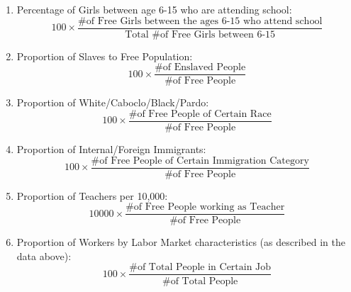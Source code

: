 \documentclass{article}
\begin{document}
\begin{enumerate}
  \item Percentage of Girls between age 6-15 who are attending school:
  \begin{equation*}
    100 \times \frac{\text{\# of Free Girls between the ages 6-15 who attend school}}{\text{Total \# of Free Girls between 6-15}}
  \end{equation*}

  \item Proportion of Slaves to Free Population:
  $$ 100 \times \frac{\text{\# of Enslaved People}}{\text{\# of Free People}} $$

  \item Proportion of White/Caboclo/Black/Pardo:
  $$ 100 \times \frac{\text{\# of Free People of Certain Race}}{\text{\# of Free People}}$$

  \item Proportion of Internal/Foreign Immigrants:
  $$ 100 \times \frac{\text{\# of Free People of Certain Immigration Category}}{\text{\# of Free People}}$$
  \item Proportion of Teachers per 10,000:
  $$ 10000 \times \frac{\text{\# of Free People working as Teacher}}{\text{\# of Free People}}$$
  \item Proportion of Workers by Labor Market characteristics (as described in the data above):
  $$ 100 \times \frac{\text{\# of Total People in Certain Job}}{\text{\# of Total People}}$$
\end{enumerate}

\clearpage
\end{document}
